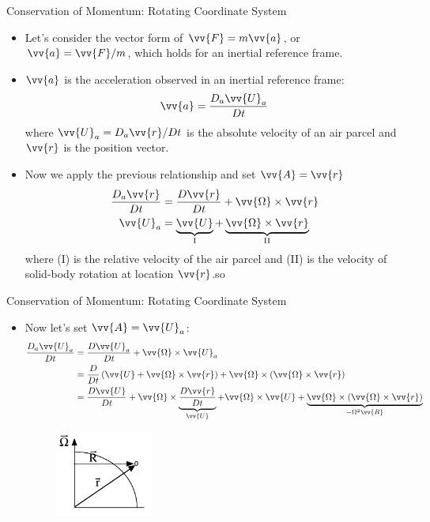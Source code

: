 \begin{frame}{Conservation of Momentum: Rotating Coordinate System}
\begin{itemize}
	\item Let's consider the vector form of $\vv{F} = m\vv{a}$, or $\vv{a} = \vv{F} /m$, which holds for an inertial reference frame.
	\item $\vv{a}$ is the acceleration observed in an inertial reference frame:
	$$\vv{a} = \frac{D_a \vv{U}_a}{Dt}$$
	where $\vv{U}_a = D_a \vv{r}/Dt$ is the absolute velocity of an air parcel and $\vv{r}$ is the position vector.
	\item Now we apply the previous relationship and set $\vv{A}=\vv{r}$
	\begin{align*}
		\frac{D_a \vv{r}}{Dt} &= \frac{D\vv{r}}{Dt} + \vv{\Omega} \times \vv{r}\\
		\vv{U}_a &= \underbrace{\vv{U}}_{\text{I}} + \underbrace{\vv{\Omega} \times \vv{r}}_{\text{II}}
	\end{align*}
	where (I) is the relative velocity of the air parcel and (II) is the velocity of solid-body rotation at location $\vv{r}$.so
\end{itemize}
\end{frame}
\begin{frame}{Conservation of Momentum: Rotating Coordinate System}
\begin{itemize}
	\item Now let's set $\vv{A} = \vv{U}_a$:
	\begin{align*}
		\frac{D_a \vv{U}_a}{Dt} &= \frac{D\vv{U}_a}{Dt} + \vv{\Omega} \times \vv{U}_a\\
		&= \frac{D}{Dt}\left(\vv{U} + \vv{\Omega} \times \vv{r}\right) + \vv{\Omega} \times \left(\vv{\Omega} \times \vv{r}\right)\\
		&= \frac{D\vv{U}}{Dt} + \vv{\Omega}\times\underbrace{\frac{D\vv{r}}{Dt}}_{\vv{U}} + \vv{\Omega} \times \vv{U} + \underbrace{\vv{\Omega}\times \left(\vv{\Omega} \times \vv{r}\right)}_{-\Omega^2\vv{R}}
	\end{align*}
	\begin{figure}
		\includegraphics[width=0.3\textwidth]{rotate3.png}	
	\end{figure}
\end{itemize}
\end{frame}
